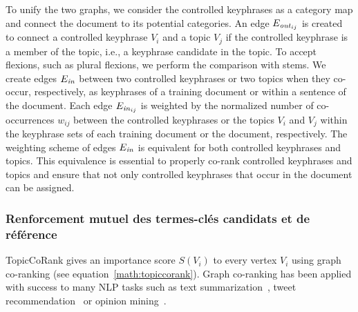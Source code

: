         To unify the two graphs, we consider the controlled keyphrases as a category map and connect the document to its potential categories. An edge
        $E_{\textnormal{\textit{out}}_{ij}}$ is created to connect a controlled
        keyphrase $V_i$ and a topic $V_j$ if the controlled keyphrase is a
        member of the topic, i.e., a keyphrase candidate in the topic.
        To accept flexions, such as plural flexions, we perform the comparison with
        stems.
        We create edges $E_\textnormal{\textit{in}}$ between two controlled
        keyphrases or two topics when they co-occur, respectively, as keyphrases of
        a training document or within a sentence of the
        document. Each edge $E_{\textnormal{\textit{in}}_{ij}}$ is weighted by
        the normalized number of co-occurrences $w_{ij}$ between the controlled
        keyphrases or the topics $V_i$ and $V_j$ within the keyphrase sets of each training document or the document, respectively. The weighting scheme of edges
        $E_\textnormal{\textit{in}}$ is equivalent for both controlled keyphrases and
        topics. This equivalence is essential to properly co-rank controlled keyphrases
        and topics and ensure that not only controlled keyphrases that occur in the document can be assigned.

      \subsubsection{Renforcement mutuel des termes-clés candidats et de référence}
      \label{subsubsec:main-automatic_keyphrase_annotation-supervised_automatic_keyphrase_extraction-topiccorank-mutual_reinforcement}
        TopicCoRank gives an importance score $S(V_i)$ to every vertex
        $V_i$ using graph co-ranking (see equation~\ref{math:topiccorank}).
        Graph co-ranking has been applied with success to many NLP tasks 
        such as text summarization~\cite{wan2011corankingsummarization}, 
        tweet recommendation~\cite{yan2012corankingtweetrecommendation} or 
        opinion mining~\cite{liu2014corankingopinionmining}.
        
        

